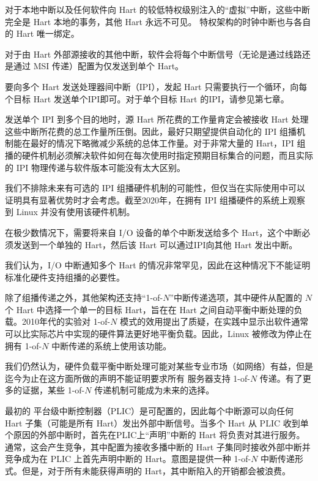 \begin{translation}
对于本地中断以及任何软件向 Hart 的较低特权级别注入的“虚拟”中断，这些中断完全是 Hart 本地的事务，其他 Hart 永远不可见。{\RISCV} 特权架构的时钟中断也与各自的 Hart 唯一绑定。

对于由 Hart 外部源接收的其他中断，软件会将每个中断信号（无论是通过线路还是通过 MSI 传递）配置为仅发送到单个 Hart。

要向多个 Hart 发送处理器间中断（IPI），发起 Hart 只需要执行一个循环，向每个目标 Hart 发送单个IPI即可。对于单个目标 Hart 的IPI，请参见第七章。

\begin{commentary}
    发送单个 IPI 到多个目的地时，源 Hart 所花费的工作量肯定会被接收 Hart 处理这些中断所花费的总工作量所压倒。因此，最好只期望提供自动化的 IPI 组播机制能在最好的情况下略微减少系统的总体工作量。对于非常大量的 Hart，IPI 组播的硬件机制必须解决软件如何在每次使用时指定预期目标集合的问题，而且实际的 IPI 物理传递与软件版本可能没有太大区别。

    我们不排除未来有可选的 IPI 组播硬件机制的可能性，但仅当在实际使用中可以证明具有显著优势时才会考虑。截至2020年，在拥有 IPI 组播硬件的系统上观察到 Linux 并没有使用该硬件机制。
\end{commentary}

在极少数情况下，需要将来自 I/O 设备的单个中断发送给多个 Hart，这个中断必须发送到一个单独的 Hart，然后该 Hart 可以通过IPI向其他 Hart 发出中断。

\begin{commentary}
我们认为，I/O 中断通知多个 Hart 的情况非常罕见，因此在这种情况下不能证明标准化硬件支持组播的必要性。
\end{commentary}

\begin{commentary}
除了组播传递之外，其他架构还支持“1-of-$N$”中断传递选项，其中硬件从配置的 $N$ 个 Hart 中选择一个单一的目标 Hart，旨在在 Hart 之间自动平衡中断处理的负载。2010年代的实验对 1-of-$N$ 模式的效用提出了质疑，在实践中显示出软件通常可以比实际芯片中实现的硬件算法更好地平衡负载。因此，Linux 被修改为停止在拥有 1-of-$N$ 中断传递的系统上使用该功能。

我们仍然认为，硬件负载平衡中断处理可能对某些专业市场（如网络）有益，但是迄今为止在这方面所做的声明不能证明要求所有 {\RISCV} 服务器支持 1-of-$N$ 传递。有了更多的证据，某些 1-of-$N$ 传递机制可能成为未来的选择。
\end{commentary}

\begin{commentary}
    最初的 {\RISCV} 平台级中断控制器（PLIC）是可配置的，因此每个中断源可以向任何 Hart 子集（可能是所有 Hart）发出外部中断信号。当多个 Hart 从 PLIC 收到单个原因的外部中断时，首先在PLIC上“声明”中断的 Hart 将负责对其进行服务。通常，这会产生竞争，其中配置为接收多播中断的 Hart 子集同时接收外部中断并竞争成为在 PLIC 上首先声明中断的 Hart。意图是提供一种 1-of-$N$ 中断传递形式。但是，对于所有未能获得声明的 Hart，其中断陷入的开销都会被浪费。
    

\end{commentary}
\end{translation}
